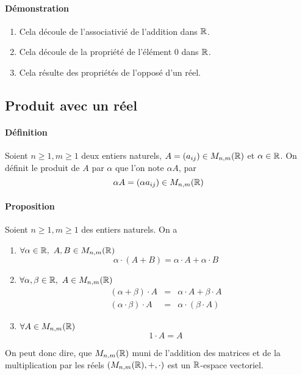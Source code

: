 \paragraph{Démonstration}
\begin{enumerate}
  \item Cela découle de l'associativié de l'addition dans $\mathbb{R}$.
  \item Cela découle de la propriété de l'élément $0$ dans $\mathbb{R}$.
  \item Cela résulte des propriétés de l'opposé d'un réel.
\end{enumerate}

%
\subsection{Produit avec un réel}
%
\paragraph{Définition} Soient $n \geq 1, m \geq 1$ deux entiers naturels, $A = (a_{ij}) \in M_{n, m}(\mathbb{R})$ et $\alpha \in \mathbb{R}$. On  définit le produit de $A$ par $\alpha$ que l'on note $\alpha A$, par
$$\alpha A = (\alpha a_{ij}) \in M_{n, m}(\mathbb{R})$$

\paragraph{Proposition} Soient $n \geq 1, m \geq 1$ des entiers naturels. On a
\begin{enumerate}
  \item $\forall \alpha \in \mathbb{R}, ~ A, B \in M_{n, m}(\mathbb{R})$ 
    $$\alpha \cdot (A + B) = \alpha \cdot A + \alpha \cdot B$$
    
  \item $\forall \alpha, \beta \in \mathbb{R}, ~ A \in M_{n, m}(\mathbb{R})$
    \begin{eqnarray*}
      (\alpha + \beta) \cdot A &=& \alpha \cdot A + \beta \cdot A \\
      (\alpha \cdot \beta) \cdot A &=& \alpha \cdot (\beta \cdot A)
    \end{eqnarray*}
    
  \item $\forall A \in M_{n, m}(\mathbb{R})$
    $$1 \cdot A = A$$
\end{enumerate}
On peut donc dire, que $M_{n, m}(\mathbb{R})$ muni de l'addition des matrices et de la multiplication par les réels $(M_{n, m}(\mathbb{R}), +, \cdot)$ est un $\mathbb{R}$-espace vectoriel.

